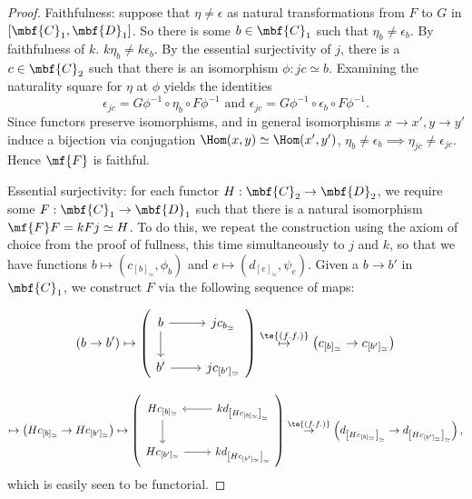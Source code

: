\begin{proof}
Faithfulness: suppose that \(\eta \neq \epsilon\) as natural transformations from \(F\) to \(G\) in \([\mbf{C}_1, \mbf{D}_1]\). So there is some \(b \in \mbf{C}_1\) such that \(\eta_b \neq \epsilon_b\). By faithfulness of \(k\). \(k \eta_b \neq k \epsilon_b\). By the essential surjectivity of \(j\), there is a \(c \in \mbf{C}_2\) such that there is an isomorphism \(\phi : jc \simeq b\). Examining the naturality square for \(\eta\) at \(\phi\) yields the identities \[\epsilon_{jc} = G \phi^{-1} \circ \eta_b \circ F \phi^{-1} \text{ and } \epsilon_{jc} = G \phi^{-1} \circ \epsilon_b \circ F \phi^{-1}.\] Since functors preserve isomorphisms, and in general isomorphisms \(x \to x', y \to y'\) induce a bijection via conjugation \(\Hom(x,y) \simeq \Hom(x',y')\), \(\eta_b \neq \epsilon_b \implies \eta_{jc} \neq \epsilon_{jc}\). Hence \(\mf{F}\) is faithful.

Essential surjectivity: for each functor \(H : \mbf{C}_2 \to \mbf{D}_2\), we require some \(F : \mbf{C}_1 \to \mbf{D}_1\) such that there is a natural isomorphism \(\mf{F} F = k F j \simeq H\). To do this, we repeat the construction using the axiom of choice from the proof of fullness, this time simultaneously to \(j\) and \(k\), so that we have functions \(b \mapsto \left(c_{[b]_{\simeq}}, \phi_b \right)\) and \(e \mapsto \left(d_{[e]_{\simeq}}, \psi_e\right)\). Given a \(b \to b'\) in \(\mbf{C}_1\), we construct \(F\) via the following sequence of maps:

\[
(b \to b') \mapsto \left(\begin{tikzcd}[ampersand replacement = \&]
b \arrow{r} \arrow{d} \& jc_{{b}_{\simeq}} \\
b' \arrow{r} \&  jc_{[b']_{\simeq}}
\end{tikzcd}\right)
\overset{\te{(f.f.)}}{\mapsto} \left(c_{[b]_{\simeq}} \to c_{[b']_{\simeq}}\right)\]

\[
\mapsto \left(Hc_{[b]_{\simeq}} \to Hc_{[b']_{\simeq}} \right) \mapsto \left(\begin{tikzcd}[ampersand replacement = \&]
H c_{[b]_{\simeq}} \arrow{d} \& kd_{\left[H c_{[b]_{\simeq}}\right]_{\simeq}} \arrow{l} \\
H c_{[b']_{\simeq}} \arrow{r} \& kd_{\left[H c_{[b']_{\simeq}}\right]_{\simeq}}
\end{tikzcd}\right) \overset{\te{(f.f.)}}{\to} \left( d_{\left[Hc_{[b]_{\simeq}} \right]_{\simeq}} \to d_{\left[Hc_{[b']_{\simeq}} \right]_{\simeq}}\right),
\]
which is easily seen to be functorial.
\end{proof}

